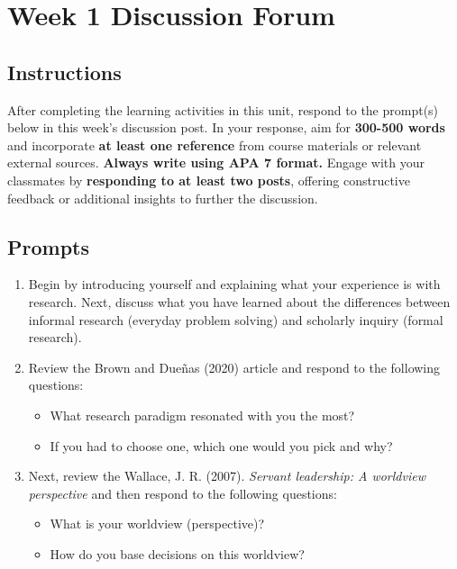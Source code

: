 \documentclass[
  letterpaper,
  DIV=11,
  numbers=noendperiod]{scrreprt}
\providecommand{\tightlist}{%
  \setlength{\itemsep}{0pt}\setlength{\parskip}{0pt}}\usepackage{longtable,booktabs,array}
\begin{document}

\chapter{Week 1 Discussion Forum}\label{week-1-discussion-forum}

\section{Instructions}\label{instructions}

After completing the learning activities in this unit, respond to the
prompt(s) below in this week's discussion post. In your response, aim
for \textbf{300-500 words} and incorporate \textbf{at least one
reference} from course materials or relevant external sources.
\textbf{Always write using APA 7 format.} Engage with your classmates by
\textbf{responding to at least two posts}, offering constructive
feedback or additional insights to further the discussion.

\section{Prompts}\label{prompts}

\begin{enumerate}
\def\labelenumi{\arabic{enumi}.}
\tightlist
\item
  Begin by introducing yourself and explaining what your experience is
  with research. Next, discuss what you have learned about the
  differences between informal research (everyday problem solving) and
  scholarly inquiry (formal research).
\item
  Review the Brown and Dueñas (2020) article and respond to the
  following questions:

  \begin{itemize}
  \tightlist
  \item
    What research paradigm resonated with you the most?
  \item
    If you had to choose one, which one would you pick and why?
  \end{itemize}
\item
  Next, review the Wallace, J. R. (2007). \emph{Servant leadership: A
  worldview perspective} and then respond to the following questions:

  \begin{itemize}
  \tightlist
  \item
    What is your worldview (perspective)?
  \item
    How do you base decisions on this worldview?
  \end{itemize}
\end{enumerate}
\end{document}
